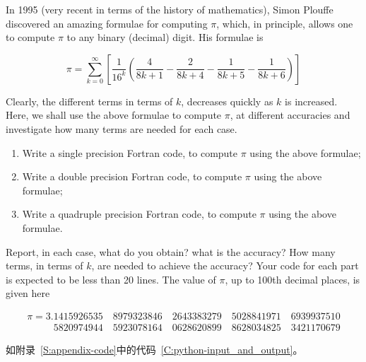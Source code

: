 \begin{homework}[label={H:1-2}]
    In 1995 (very recent in terms of the history of mathematics), Simon Plouffe discovered an amazing formulae for computing $\pi$, which, in principle, allows one to compute $\pi$ to any binary (decimal) digit. His formulae is

    \[
        \pi = \sum_{k=0}^{\infty} \left[
            \frac{1}{16^k} \left(
                \frac{4}{8k+1} - \frac{2}{8k+4} - \frac{1}{8k+5} - \frac{1}{8k+6}
            \right)
        \right]
    \]

    Clearly, the different terms in terms of $k$, decreases quickly as $k$ is increased. Here, we shall use the above formulae to compute $\pi$, at different accuracies and investigate how many terms are needed for each case.

    \begin{enumerate}[label=(\alph*)]
        \item Write a single precision Fortran code, to compute $\pi$ using the above formulae;
        \item Write a double precision Fortran code, to compute $\pi$ using the above formulae;
        \item Write a quadruple precision Fortran code, to compute $\pi$ using the above formulae.
    \end{enumerate}

    Report, in each case, what do you obtain? what is the accuracy? How many terms, in terms of $k$, are needed to achieve the accuracy? Your code for each part is expected to be less than 20 lines. The value of $\pi$, up to 100th decimal places, is given here

    \begin{align*}
        \pi =              3.1415926535 \quad 8979323846 \quad 2643383279 \quad 5028841971 \quad 6939937510 \\
            \phantom{\pi=3.} 5820974944 \quad 5923078164 \quad 0628620899 \quad 8628034825 \quad 3421170679
    \end{align*}
\end{homework}

如附录~\ref{S:appendix-code}中的代码~\ref{C:python-input_and_output}。

